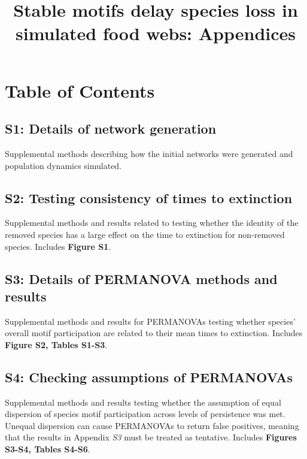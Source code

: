 \documentclass[12pt]{article}
\title{Stable motifs delay species loss in simulated food webs: Appendices}
\date{}
\author{}
\begin{document}
 
\maketitle 
\raggedright
\vspace{-1.25in}
\setlength{\parindent}{15pt} 

\section*{Table of Contents}

    \subsection*{S1: Details of network generation}

        Supplemental methods describing how the initial networks were generated and population dynamics simulated.

    \subsection*{S2: Testing consistency of times to extinction}
    
        Supplemental methods and results related to testing whether the identity of the removed species has a large effect on the time to extinction for non-removed species. Includes \textbf{Figure S1}.
    
    \subsection*{S3: Details of PERMANOVA methods and results}
        
        Supplemental methods and results for PERMANOVAs testing whether species' overall motif participation are related to their mean times to extinction. Includes \textbf{Figure S2, Tables S1-S3}.

    \subsection*{S4: Checking assumptions of PERMANOVAs}


    	Supplemental methods and results testing whether the assumption of equal dispersion of species motif participation across levels of persistence was met. Unequal dispersion can cause PERMANOVAs to return false positives, meaning that the results in Appendix \emph{S3} must be treated as tentative. Includes \textbf{Figures S3-S4, Tables S4-S6}.
\end{document}
